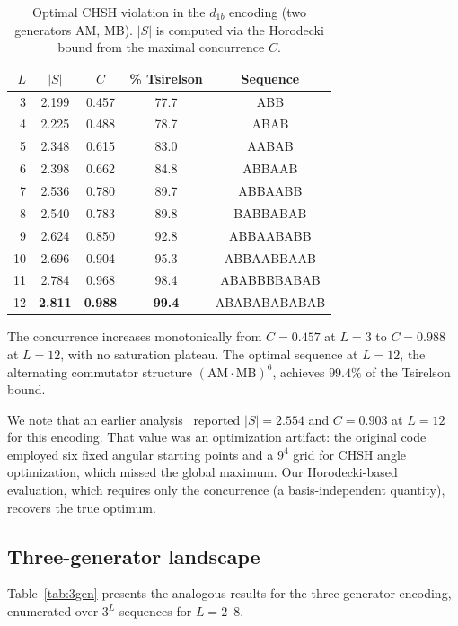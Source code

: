 \documentclass[aps,pra,twocolumn,superscriptaddress,longbibliography,floatfix,nofootinbib]{revtex4-2}
\begin{document}
\begin{table}[!htb]
\caption{%
Optimal CHSH violation in the $d_{1b}$ encoding
(two generators AM, MB).
$|S|$ is computed via the Horodecki bound from the
maximal concurrence $C$.
}
\label{tab:d1b}
\begin{ruledtabular}
\begin{tabular}{rcccc}
$L$ & $|S|$ & $C$ & \% Tsirelson & Sequence \\
\hline
 3 & 2.199 & 0.457 & 77.7 & ABB \\
 4 & 2.225 & 0.488 & 78.7 & ABAB \\
 5 & 2.348 & 0.615 & 83.0 & AABAB \\
 6 & 2.398 & 0.662 & 84.8 & ABBAAB \\
 7 & 2.536 & 0.780 & 89.7 & ABBAABB \\
 8 & 2.540 & 0.783 & 89.8 & BABBABAB \\
 9 & 2.624 & 0.850 & 92.8 & ABBAABABB \\
10 & 2.696 & 0.904 & 95.3 & ABBAABBAAB \\
11 & 2.784 & 0.968 & 98.4 & ABABBBBABAB \\
12 & \textbf{2.811} & \textbf{0.988} & \textbf{99.4} & ABABABABABAB \\
\end{tabular}
\end{ruledtabular}
\end{table}

The concurrence increases monotonically from $C=0.457$ at $L=3$ to
$C=0.988$ at $L=12$, with no saturation plateau.
The optimal sequence at $L=12$, the alternating commutator structure
$(\text{AM}\cdot\text{MB})^6$, achieves $99.4\%$ of the Tsirelson
bound.

We note that an earlier analysis~\cite{Sayim2026topological} reported
$|S|=2.554$ and $C=0.903$ at $L=12$ for this encoding.
That value was an optimization artifact: the original code
employed six fixed angular starting points and a $9^4$ grid
for CHSH angle optimization, which missed the global maximum.
Our Horodecki-based evaluation, which requires only the
concurrence (a basis-independent quantity), recovers the
true optimum.

\subsection{Three-generator landscape}

Table~\ref{tab:3gen} presents the analogous results for the
three-generator encoding, enumerated over $3^L$ sequences
for $L=2$--$8$.
\end{document}
